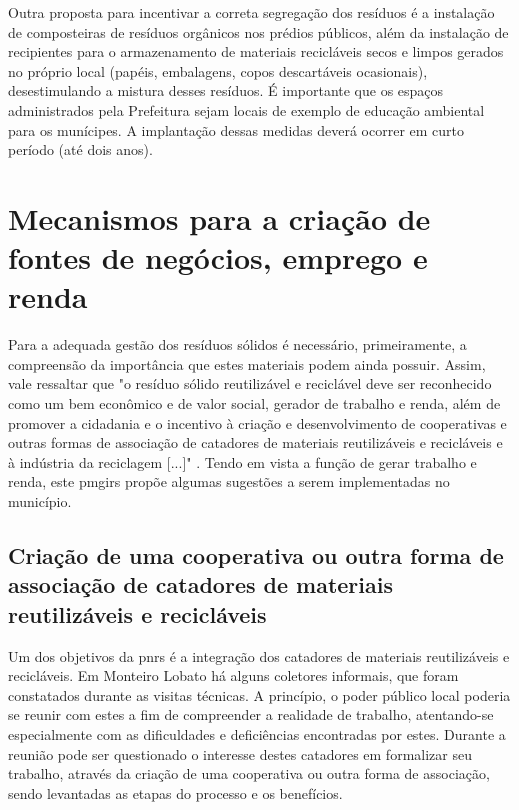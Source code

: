 Outra proposta para incentivar a correta segregação dos resíduos é a instalação de composteiras de resíduos orgânicos nos prédios públicos, além da instalação de recipientes para o armazenamento de materiais recicláveis secos e limpos gerados no próprio local (papéis, embalagens, copos descartáveis ocasionais), desestimulando a mistura desses resíduos. É importante que os espaços administrados pela Prefeitura sejam locais de exemplo de educação ambiental para os munícipes. A implantação dessas medidas deverá ocorrer em curto período (até dois anos).  


\FloatBarrier
\newpage
\section{Mecanismos para a criação de fontes de negócios, emprego e renda}
\label{sec:mec_renda}

Para a adequada gestão dos resíduos sólidos é necessário, primeiramente, a compreensão da importância que estes materiais podem ainda possuir. Assim, vale ressaltar que "o resíduo sólido reutilizável e reciclável deve ser reconhecido como um bem econômico e de valor social, gerador de trabalho e renda, além de promover a cidadania e o incentivo à criação e desenvolvimento de cooperativas e outras formas de associação de catadores de materiais reutilizáveis e recicláveis e à indústria da reciclagem [...]" \cite{agevap_manual_2019}. Tendo em vista a função de gerar trabalho e renda, este \gls{pmgirs} propõe algumas sugestões a serem implementadas no município.

\subsection{Criação de uma cooperativa ou outra forma de associação de catadores de materiais reutilizáveis e recicláveis}

Um dos objetivos da \gls{pnrs} é a integração dos catadores de materiais reutilizáveis e recicláveis. Em Monteiro Lobato há alguns coletores informais, que foram constatados durante as visitas técnicas. A princípio, o poder público local poderia se reunir com estes a fim de compreender a realidade de trabalho, atentando-se especialmente com as dificuldades e deficiências encontradas por estes. Durante a reunião pode ser questionado o interesse destes catadores em formalizar seu trabalho, através da criação de uma cooperativa ou outra forma de associação, sendo levantadas as etapas do processo e os benefícios.

